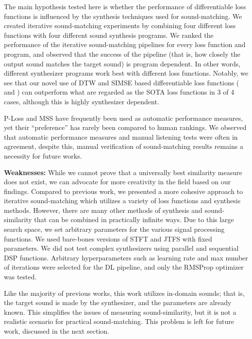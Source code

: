 The main hypothesis tested here is whether the performance of differentiable loss functions is influenced by the synthesis techniques used for sound-matching. We created iterative sound-matching experiments by combining four different loss functions with four different sound synthesis programs. We ranked the performance of the iterative sound-matching pipelines for every loss function and program, and observed that the success of the pipeline (that is, how closely the output sound matches the target sound) is program dependent. In other words, different synthesizer programs work best with different loss functions. Notably, we see that our novel use of DTW and SIMSE based differentiable loss functions (\DTWEnv{} and \SIMSESpec) can outperform what are regarded as the SOTA loss functions in 3 of 4 cases, although this is highly synthesizer dependent. 



P-Loss and MSS have frequently been used as automatic performance measures, yet their ``preference'' has rarely been compared to human rankings. We observed that automatic performance measures and manual listening tests were often in agreement, despite this, manual verification of sound-matching results remains a necessity for future works.  

\textbf{Weaknesses:} 
While we cannot prove that a universally best similarity measure does not exist, we can advocate for more creativity in the field based on our findings. Compared to previous work, we presented a more cohesive approach to iterative sound-matching which utilizes a variety of loss functions and synthesis methods. However, there are many other methods of synthesis and sound-similarity that can be combined in practically infinite ways. Due to this large search space, we set arbitrary parameters for the various signal processing functions. We used bare-bones versions of STFT and JTFS with fixed parameters. We did not test complex synthesizers using parallel and sequential DSP functions. Arbitrary hyperparameters such as learning rate and max number of iterations were selected for the DL pipeline, and only the RMSProp optimizer was tested. 

 Like the majority of previous works, this work utilizes in-domain sounds; that is, the target sound is made by the synthesizer, and the parameters are already known. This simplifies the issues of measuring sound-similarity, but it is not a realistic scenario for practical sound-matching. This problem is left for future work, discussed in the next section.


